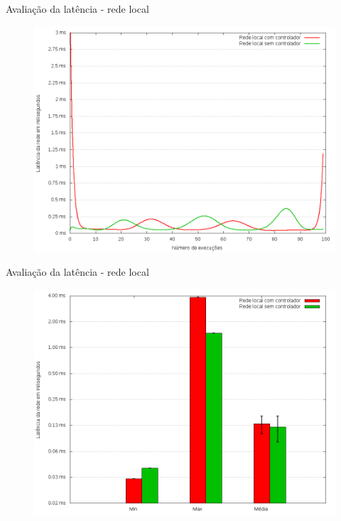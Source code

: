 \begin{frame}{Avaliação da latência - rede local}

    \begin{figure}[!htb]
        \centering
        \includegraphics[scale=.35]{images/local-latency}
    \end{figure}
\end{frame}



\begin{frame}{Avaliação da latência - rede local}

    \begin{figure}[!htb]
        \centering
        \includegraphics[scale=.35]{images/local-latency-stats}
    \end{figure}
\end{frame}


